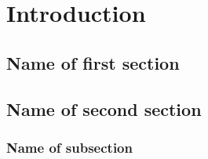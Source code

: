\chapter{Introduction}
\label{chap: intro}
\setcounter{page}{1}


\vspace*{-2mm}
\section{Name of first section}
\label{sec: chap1 motivation}

\lipsum[9-13]


\section{Name of second section}
\label{sec: chap1 background}

\lipsum[14-18]

\subsection{Name of subsection}
\label{subsec: chap1 background2}

